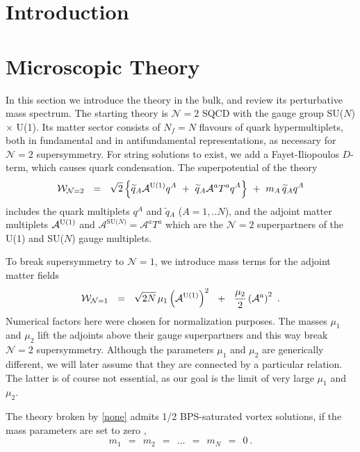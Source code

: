 \documentclass[12pt]{article}
\def\beq{\begin{equation}}
\def\eeq{\end{equation}}
\newcommand{\ntwo}{${\mathcal N}=2$ }
\newcommand{\nonen}{${\mathcal N}=1$}
\newcommand{\wt}{\widetilde}
\newcommand{\mc}[1]{\mathcal{#1}}
\newcommand{\sunun}{{\rm SU($N$) $\times$ U(1)}}
\newcommand{\AU}{\mc{A}^{\rm U(1)}}
\newcommand{\AN}{\mc{A}^\text{SU($N$)}}
\begin{document}
%
%
\section{Introduction}


%
%
\section{Microscopic Theory}
\setcounter{equation}{0}

In this section we introduce the theory in the bulk, and review its perturbative mass spectrum.
The starting theory is $\mc{N}=2$ SQCD with the gauge group \sunun.
Its matter sector consists of $ N_f = N $ flavours of quark hypermultiplets,
both in fundamental and in antifundamental representations, as necessary for $ \mc{N}=2 $ supersymmetry.
For string solutions to exist, we add a Fayet-Iliopoulos $D$-term, which causes quark
condensation.
The superpotential of the theory 
\beq
\label{ntwo}
	\mc{W}_{\mc{N}=2} ~~=~~  \sqrt{2}\, \Bigl\{ 
					\wt{q}{}_A \AU q^A ~+~
					\wt{q}{}_A \mc{A}^a T^a q^A \Bigr\}  ~+~
				m_A\, \wt{q}{}_A q^A
\eeq
includes the quark multiplets $ q^A $ and $ \wt{q}{}_A $ ($A = 1, .. N$), and the adjoint matter multiplets
$ \AU $ and $ \AN = \mc{A}^a T^a $ which are the $ \mc{N}=2 $ superpartners of the U(1) and SU($N$) 
gauge multiplets.

To break supersymmetry to \nonen, we introduce mass terms for the adjoint matter fields
\beq
\label{none}
	\mc{W}_{\mc{N}=1} ~~=~~ \sqrt{2N}\,\mu_1 \left(\mc{A}^{\rm U(1)}\right)^2  ~~+~~
				\frac{\mu_2}{2} \left( \mc{A}^a \right)^2 ~.
\eeq
Numerical factors here were chosen for normalization purposes. 
The masses $ \mu_1 $ and $ \mu_2 $ lift the adjoints above their gauge superpartners and this way break \ntwo
supersymmetry.
Although the parameters $ \mu_1 $ and $ \mu_2 $ are generically different, we will later assume that
they are connected by a particular relation.
The latter is of course not essential, as our goal is the limit of very large $ \mu_1$ and $\mu_2$. 

The theory broken by \eqref{none} admits 1/2 BPS-saturated vortex solutions, if the mass parameters
are set to zero \cite{SYrev,SYnone,Edalati},
\beq
\label{qmasses}
	m_1 ~~=~~ m_2 ~~=~~ \dots ~~=~~ m_N ~~=~~ 0~.
\eeq
\end{document}
